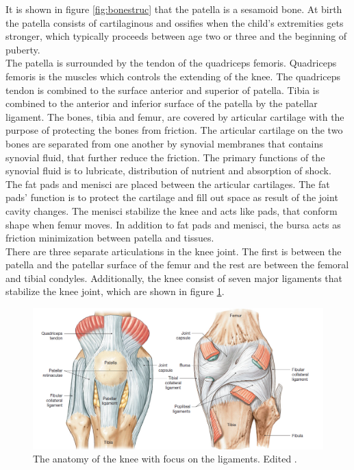 \noindent
It is shown in figure \ref{fig:bonestruc} that the patella is a sesamoid bone. At birth the patella consists of cartilaginous and ossifies when the child’s extremities gets stronger, which typically proceeds between age two or three and the beginning of puberty. \\
\noindent
The patella is surrounded by the tendon of the quadriceps femoris. Quadriceps femoris is the muscles which controls the extending of the knee. The quadriceps tendon is combined to the surface anterior and superior of patella. Tibia is combined to the anterior and inferior surface of the patella by the patellar ligament. The bones, tibia and femur, are covered by articular cartilage with the purpose of protecting the bones from friction. The articular cartilage on the two bones are separated from one another by synovial membranes that contains synovial fluid, that further reduce the friction. The primary functions of the synovial fluid is to lubricate, distribution of nutrient and absorption of shock.\citep{Martini2012}\newline
\noindent
The fat pads and menisci are placed between the articular cartilages. The fat pads’ function is to protect the cartilage and fill out space as result of the joint cavity changes. The menisci stabilize the knee and acts like pads, that conform shape when femur moves. In addition to fat pads and menisci, the bursa acts as friction minimization between patella and tissues.\citep{Martini2012} \\
There are three separate articulations in the knee joint. The first is between the patella and the patellar surface of the femur and the rest are between the femoral and tibial condyles. Additionally, the knee consist of seven major ligaments that stabilize the knee joint, which are shown in figure \ref{fig:knee}.\citep{Martini2012}

\begin{figure} [H]
\centering
\includegraphics[width=1\textwidth]{figures/knee}
\caption{The anatomy of the knee with focus on the ligaments. Edited \citep{Martini2012}.}
\label{fig:knee}
\end{figure}


